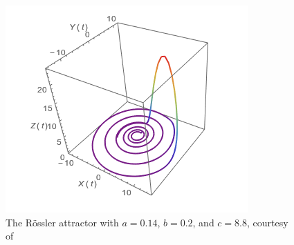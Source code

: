 \documentclass{article}
\begin{document}
\begin{figure}[h]
	\centering
	\includegraphics[scale=0.7]{attractor_a0p14_b0p2_c8p8}
	\caption{The R\"{o}ssler attractor with $a=0.14$, $b=0.2$, and $c=8.8$, courtesy of \cite{rossler_wf}}
	\label{fig:3dsys_02}
\end{figure}
\end{document}
